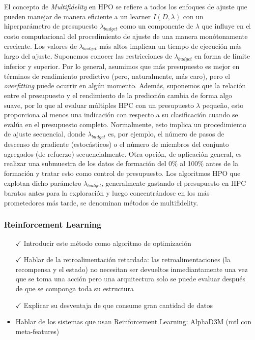 El concepto de \textit{Multifidelity} en HPO se refiere a todos los enfoques de ajuste que pueden manejar de manera eficiente a un learner $I(D, \lambda)$ con un hiperparámetro de presupuesto $\lambda_{budget}$ como un componente de $\lambda$ que influye en el costo computacional del procedimiento de ajuste de una manera monótonamente creciente. Los valores de $\lambda_{budget}$ más altos implican un tiempo de ejecución más largo del ajuste. Suponemos conocer las restricciones de $\lambda_{budget}$ en forma de límite inferior y superior. Por lo general, asumimos que más presupuesto es mejor en términos de rendimiento predictivo (pero, naturalmente, más caro), pero el \textit{overfitting} puede ocurrir en algún momento. Además, suponemos que la relación entre el presupuesto y el rendimiento de la predicción cambia de forma algo suave, por lo que al evaluar múltiples HPC con un presupuesto $\lambda$ pequeño, esto proporciona al menos una indicación con respecto a su clasificación cuando se evalúa en el presupuesto completo. Normalmente, esto implica un procedimiento de ajuste secuencial, donde $\lambda_{budget}$ es, por ejemplo,  el número de pasos de descenso de gradiente (estocásticos) o el número de miembros del conjunto agregados (de refuerzo) secuencialmente. Otra opción, de aplicación general, es realizar una submuestra de los datos de formación del 0\% al 100\% antes de la formación y tratar esto como control de presupuesto. Los algoritmos HPO que explotan dicho parámetro $\lambda_{budget}$, generalmente gastando el presupuesto en HPC baratos antes para la exploración y luego concentrándose en los más prometedores más tarde, se denominan métodos de multifidelity.

\subsubsection{Reinforcement Learning}

\begin{itemize}
	\item[$\checkmark$] Introducir este método como algoritmo de optimización
	\item[$\checkmark$] Hablar de la retroalimentación retardada: las retroalimentaciones (la recompensa y el estado) no necesitan ser devueltos inmediantamente una vez que se toma una acción pero una arquitectura solo se puede evaluar después de que se componga toda su estructura
	\item[$\checkmark$] Explicar su desventaja de que consume gran cantidad de datos
	\item Hablar de los sistemas que usan Reinforcement Learning: AlphaD3M (mtl con meta-features)
\end{itemize}

